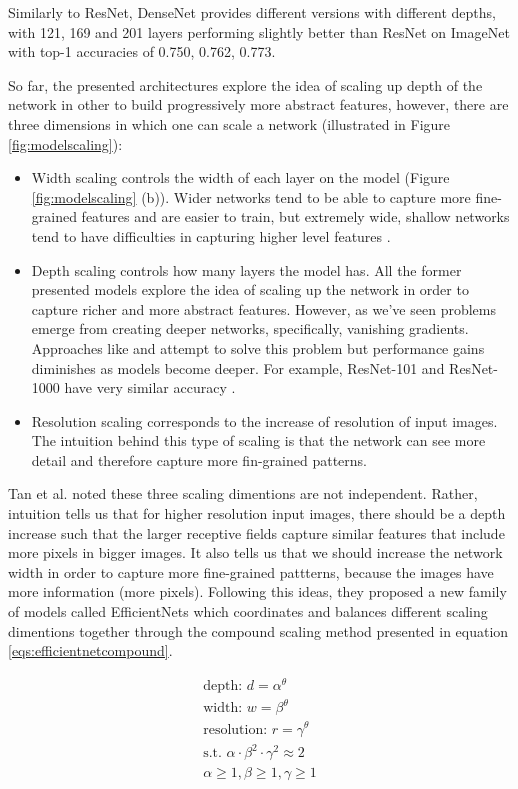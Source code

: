     Similarly to ResNet, DenseNet provides different versions with different depths, with 121, 169 and 201 layers performing slightly better than ResNet on ImageNet with top-1 accuracies of 0.750, 0.762, 0.773.
    
    So far, the presented architectures explore the idea of scaling up depth of the network in other to build progressively more abstract features, however, there are three dimensions in which one can scale a network  (illustrated in Figure \ref{fig:modelscaling}): 
    \begin{itemize}
        \item Width scaling controls the width of each layer on the model (Figure \ref{fig:modelscaling} (b)). Wider networks tend to be able to capture more fine-grained features and are easier to train, but extremely wide, shallow networks tend to have difficulties in capturing higher level features \cite{efficientnet}.
        \item Depth scaling controls how many layers the model has. All the former presented models explore the idea of scaling up the network in order to capture richer and more abstract features. However, as we've seen problems emerge from creating deeper networks, specifically, vanishing gradients. Approaches like \cite{resnet} and \cite{densenet} attempt to solve this problem but performance gains diminishes as models become deeper. For example, ResNet-101 and ResNet-1000 have very similar accuracy \cite{resnet}.
        \item Resolution scaling corresponds to the increase of resolution of input images. The intuition behind this type of scaling is that the network can see more detail and therefore capture more fin-grained patterns. 
    \end{itemize}
    Tan et al. noted these three scaling dimentions are not independent. Rather, intuition tells us that for higher resolution input images, there should be a depth increase such that the larger receptive fields capture similar features that include more pixels in bigger images. It also tells us that we should increase the network width in order to capture more fine-grained pattterns, because the images have more information (more pixels). Following this ideas, they proposed a new family of models called EfficientNets \cite{efficientnet} which coordinates and balances different scaling dimentions together through the compound scaling method presented in equation \ref{eqs:efficientnetcompound}. \par
    \begin{equation}
        \begin{split}
            \text{depth: } d = \alpha^\theta \\
            \text{width: } w = \beta^\theta \\
            \text{resolution: } r = \gamma^\theta \\
            \text{s.t. } \alpha\cdot\beta^2\cdot\gamma^2\approx2 \\
            \alpha \geq 1, \beta \geq 1, \gamma \geq 1
            \label{eqs:efficientnetcompound}
        \end{split}
    \end{equation}
    
